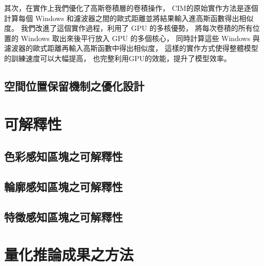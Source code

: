 \documentclass[class=NCU_thesis, crop=false]{standalone}
\begin{document}
	其次，在實作上我們優化了高斯卷積層的卷積操作，
	CIM的原始實作方法是逐個計算每個 Windows 和濾波器之間的歐式距離並將結果輸入進高斯函數得出相似度。
	我們改進了這個實作過程，利用了 GPU 的多核優勢，
	將每次卷積的所有位置的 Windows 取出來後平行放入 GPU 的多個核心，
	同時計算這些 Windows 與濾波器的歐式距離再輸入高斯函數中得出相似度，
	這樣的實作方式使得整體模型的訓練速度可以大幅提高，
	也完整利用GPU的效能，提升了模型效率。

	\subsection{空間位置保留機制之優化設計}



\section{可解釋性}
	\subsection{色彩感知區塊之可解釋性}
	\subsection{輪廓感知區塊之可解釋性}
	\subsection{特徵感知區塊之可解釋性}

\section{量化推論成果之方法}
\end{document}
